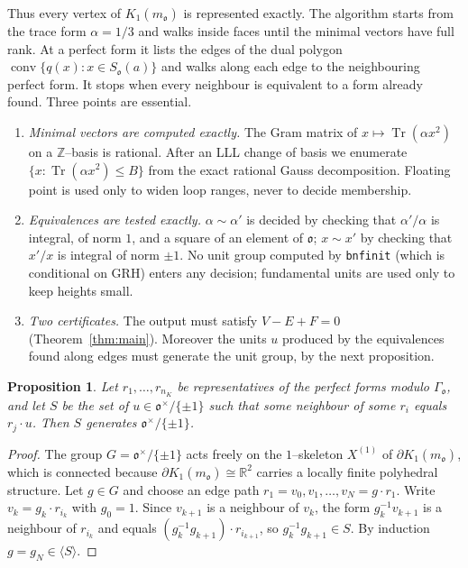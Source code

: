 \documentclass[11pt,reqno]{amsart}
\theoremstyle{plain}
\newtheorem{proposition}[theorem]{Proposition}
\theoremstyle{definition}
\newcommand{\Z}{\mathbb{Z}}
\newcommand{\R}{\mathbb{R}}
\newcommand{\Tr}{\operatorname{Tr}}
\newcommand{\conv}{\operatorname{conv}}
\newcommand{\Ok}{\mathfrak{o}}
\newcommand{\bdy}{\partial}
\newcommand{\nK}{n_K}
\begin{document}
Thus every vertex of $K_1(m_\Ok)$ is represented exactly. The algorithm starts from the trace form
$\alpha=1/3$ and walks inside faces until the minimal vectors have full rank. At a perfect form it lists the
edges of the dual polygon $\conv\{q(x):x\in S_\Ok(a)\}$ and walks along each edge to the neighbouring perfect
form. It stops when every neighbour is equivalent to a form already found. Three points are essential.

\begin{enumerate}[label=\textup{(\roman*)},leftmargin=2.2em]
\item \emph{Minimal vectors are computed exactly.} The Gram matrix of $x\mapsto\Tr(\alpha x^2)$ on a
$\Z$--basis is rational. After an LLL change of basis we enumerate $\{x:\Tr(\alpha x^2)\le B\}$ from the
exact rational Gauss decomposition. Floating point is used only to widen loop ranges, never to decide
membership.
\item \emph{Equivalences are tested exactly.} $\alpha\sim\alpha'$ is decided by checking that
$\alpha'/\alpha$ is integral, of norm $1$, and a square of an element of $\Ok$; $x\sim x'$ by checking that
$x'/x$ is integral of norm $\pm1$. No unit group computed by \texttt{bnfinit} (which is conditional on GRH)
enters any decision; fundamental units are used only to keep heights small.
\item \emph{Two certificates.} The output must satisfy $V-E+F=0$ (Theorem~\ref{thm:main}). Moreover the
units $u$ produced by the equivalences found along edges must generate the unit group, by the next
proposition.
\end{enumerate}

\begin{proposition}\label{prop:sidepair}
Let $r_1,\dots,r_{\nK}$ be representatives of the perfect forms modulo $\Gamma_\Ok$, and let $S$ be the set of
$u\in\Ok^\times/\{\pm1\}$ such that some neighbour of some $r_i$ equals $r_j\cdot u$. Then $S$ generates
$\Ok^\times/\{\pm1\}$.
\end{proposition}

\begin{proof}
The group $G=\Ok^\times/\{\pm1\}$ acts freely on the $1$--skeleton $X^{(1)}$ of $\bdy K_1(m_\Ok)$, which is
connected because $\bdy K_1(m_\Ok)\cong\R^2$ carries a locally finite polyhedral structure. Let $g\in G$ and
choose an edge path $r_1=v_0,v_1,\dots,v_N=g\cdot r_1$. Write $v_k=g_k\cdot r_{i_k}$ with $g_0=1$. Since
$v_{k+1}$ is a neighbour of $v_k$, the form $g_k^{-1}v_{k+1}$ is a neighbour of $r_{i_k}$ and equals
$(g_k^{-1}g_{k+1})\cdot r_{i_{k+1}}$, so $g_k^{-1}g_{k+1}\in S$. By induction $g=g_N\in\langle S\rangle$.
\end{proof}
\end{document}
